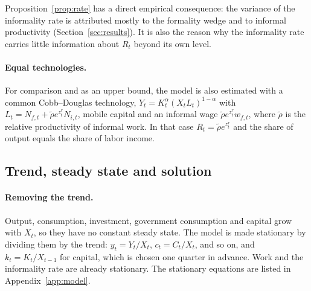 Proposition~\ref{prop:rate} has a direct empirical consequence: the variance of the informality rate is attributed mostly to the formality wedge and to informal productivity (Section~\ref{sec:results}). It is also the reason why the informality rate carries little information about $R_t$ beyond its own level.

\paragraph{Equal technologies.} For comparison and as an upper bound, the model is also estimated with a common Cobb--Douglas technology, $Y_t=K_t^{\alpha}(X_tL_t)^{1-\alpha}$ with $L_t=N_{f,t}+\tilde\rho e^{z^r_t}N_{i,t}$, mobile capital and an informal wage $\tilde\rho e^{z^r_t}w_{f,t}$, where $\tilde\rho$ is the relative productivity of informal work. In that case $R_t = \tilde\rho e^{z^r_t}$ and the share of output equals the share of labor income.

\subsection{Trend, steady state and solution}
\label{sec:steady}

\paragraph{Removing the trend.} Output, consumption, investment, government consumption and capital grow with $X_t$, so they have no constant steady state. The model is made stationary by dividing them by the trend: $y_t=Y_t/X_t$, $c_t=C_t/X_t$, and so on, and $k_t=K_t/X_{t-1}$ for capital, which is chosen one quarter in advance. Work and the informality rate are already stationary. The stationary equations are listed in Appendix~\ref{app:model}.

